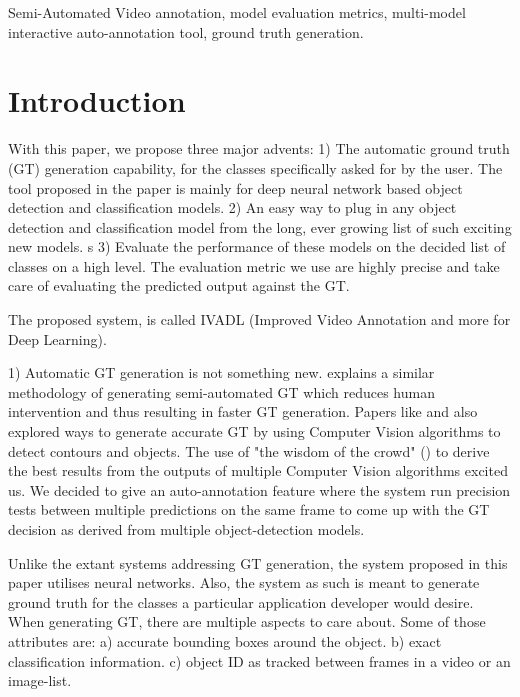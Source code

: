 \documentclass[conference]{IEEEtran}
\begin{document}
\begin{IEEEkeywords}
Semi-Automated Video annotation, model evaluation metrics, multi-model interactive auto-annotation tool, ground truth generation.
\end{IEEEkeywords}

%
\IEEEpeerreviewmaketitle


\section{Introduction}

With this paper, we propose three major advents:
1) The automatic ground truth (GT) generation capability, for the classes specifically asked for by the user. The tool proposed in the paper is mainly for deep neural network based object detection and classification models.
2) An easy way to plug in any object detection and classification model from the long, ever growing list of such exciting new models. s
3) Evaluate the performance of these models on the decided list of classes on a high level. The evaluation metric we use are highly precise and take care of evaluating the predicted output against the GT.

The proposed system, is called IVADL (Improved Video Annotation and more for Deep Learning).

1) Automatic GT generation is not something new. \cite{dominguez2014gtgencv} explains a similar methodology of generating semi-automated GT which reduces human intervention and thus resulting in faster GT generation. Papers like \cite{comaschi2014gtgencv} and \cite{kavasidis2012gtgencv} also explored ways to generate accurate GT by using Computer Vision algorithms to detect contours and objects. The use of "the wisdom of the crowd" (\cite{dominguez2014gtgencv}) to derive the best results from the outputs of multiple Computer Vision algorithms excited us. We decided to give an auto-annotation feature where the system run precision tests between multiple predictions on the same frame to come up with the GT decision as derived from multiple object-detection models. \par
Unlike the extant systems addressing GT generation, the system proposed in this paper utilises neural networks. Also, the system as such is meant to generate ground truth for the classes a particular application developer would desire. When generating GT, there are multiple aspects to care about. Some of those attributes are:
a) accurate bounding boxes around the object.
b) exact classification information.
c) object ID as tracked between frames in a video or an image-list.
\end{document}
